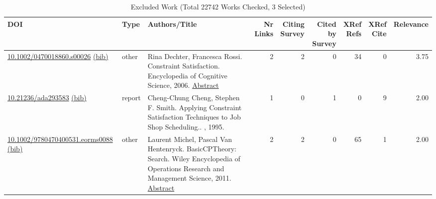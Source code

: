 {\scriptsize
\begin{longtable}{p{5cm}lp{11cm}rrrrrr}
\caption{Excluded Work (Total 22742 Works Checked, 3 Selected)}\\ \toprule
DOI & Type & Authors/Title & \shortstack{Nr\\Links} & \shortstack{Citing\\Survey} & \shortstack{Cited by\\Survey} & \shortstack{XRef\\Refs} & \shortstack{XRef\\Cite} & Relevance\\ \midrule\endhead
\bottomrule
\endfoot
\href{http://dx.doi.org/10.1002/0470018860.s00026}{10.1002/0470018860.s00026} \href{https://www.doi2bib.org/bib/10.1002/0470018860.s00026}{(bib)} & other & Rina Dechter, Francesca Rossi. Constraint Satisfaction. Encyclopedia of Cognitive Science, 2006. \hyperref[mw:mw15641]{Abstract} & 2 & 2 & 0 & 34 & 0 &  3.75\\
\href{http://dx.doi.org/10.21236/ada293583}{10.21236/ada293583} \href{https://www.doi2bib.org/bib/10.21236/ada293583}{(bib)} & report & Cheng-Chung Cheng, Stephen F. Smith. Applying Constraint Satisfaction Techniques to Job Shop Scheduling.. , 1995. & 1 & 0 & 1 & 0 & 9 &  2.00\\
\href{http://dx.doi.org/10.1002/9780470400531.eorms0088}{10.1002/9780470400531.eorms0088} \href{https://www.doi2bib.org/bib/10.1002/9780470400531.eorms0088}{(bib)} & other & Laurent Michel, Pascal Van Hentenryck. BasicCPTheory: Search. Wiley Encyclopedia of Operations Research and Management Science, 2011. \hyperref[mw:mw19351]{Abstract} & 2 & 2 & 0 & 65 & 1 &  2.00\\
\end{longtable}
}

